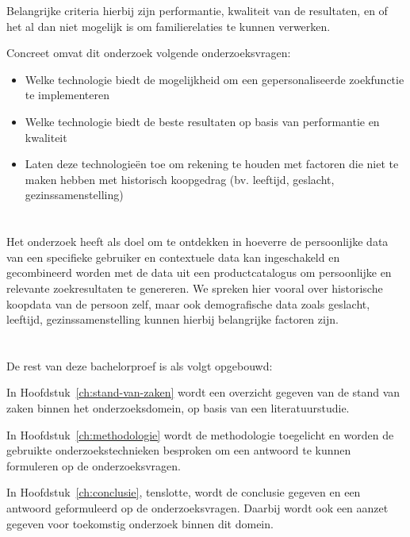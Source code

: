 Belangrijke criteria hierbij zijn performantie, kwaliteit van de resultaten, en of het al dan niet mogelijk is om familierelaties te kunnen verwerken. 

Concreet omvat dit onderzoek volgende onderzoeksvragen:
\begin{itemize}
	\item Welke technologie biedt de mogelijkheid om een gepersonaliseerde zoekfunctie te implementeren
	\item Welke technologie biedt de beste resultaten op basis van performantie en kwaliteit
	\item Laten deze technologieën toe om rekening te houden met factoren die niet te maken hebben met historisch koopgedrag (bv. leeftijd, geslacht, gezinssamenstelling)

\end{itemize} 

\section{}
\label{sec:onderzoeksdoelstelling}

Het onderzoek heeft als doel om te ontdekken in hoeverre de persoonlijke data van een specifieke gebruiker en contextuele data kan ingeschakeld en gecombineerd worden met de data uit een productcatalogus om persoonlijke en relevante zoekresultaten te genereren.
We spreken hier vooral over historische koopdata van de persoon zelf, maar ook demografische data zoals geslacht, leeftijd, gezinssamenstelling kunnen hierbij belangrijke factoren zijn. 

\section{}
\label{sec:opzet-bachelorproef}


De rest van deze bachelorproef is als volgt opgebouwd:

In Hoofdstuk~\ref{ch:stand-van-zaken} wordt een overzicht gegeven van de stand van zaken binnen het onderzoeksdomein, op basis van een literatuurstudie.

In Hoofdstuk~\ref{ch:methodologie} wordt de methodologie toegelicht en worden de gebruikte onderzoekstechnieken besproken om een antwoord te kunnen formuleren op de onderzoeksvragen.


In Hoofdstuk~\ref{ch:conclusie}, tenslotte, wordt de conclusie gegeven en een antwoord geformuleerd op de onderzoeksvragen. Daarbij wordt ook een aanzet gegeven voor toekomstig onderzoek binnen dit domein.